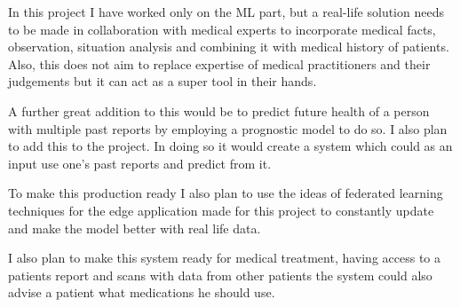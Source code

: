 \documentclass[a4paper]{article}
\begin{document}
\qquad In this project I have worked only on the ML part, but a real-life solution needs to be made in collaboration with medical experts to incorporate medical facts, observation, situation analysis and combining it with medical history of patients. Also, this does not aim to replace expertise of medical practitioners and their judgements but it can act as a super tool in their hands.

\qquad A further great addition to this would be to predict future health of a person with multiple past reports by employing a prognostic model to do so. I also plan to add this to the project. In doing so it would create a system which could as an input use one's past reports and predict from it.

\qquad To make this production ready I also plan to use the ideas of federated learning techniques for the edge application made for this project to constantly update and make the model better with real life data.

\qquad I also plan to make this system ready for medical treatment, having access to a patients report and scans with data from other patients the system could also advise a patient what medications he should use.

\printbibliography
\end{document}
